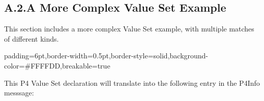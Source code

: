\documentclass[11pt]{article}
\begin{document}
{%
\subsection{A.2.\hspace*{0.5em}A More Complex Value Set Example}\label{sec-value-set-example}%

\noindent{}This section includes a more complex Value Set example, with multiple matches of
different kinds.%

\begin{mdbmargintb}{6pt}{6pt}%
\begin{mdblock}{padding=6pt,border-width=0.5pt,border-style=solid,background-color=\#FFFFDD,breakable=true}%
\begin{mdpre}%
\end{mdpre}%
\end{mdblock}%
\end{mdbmargintb}%

\noindent{}This P4 Value Set declaration will translate into the following entry in the
P4Info messsage:%

}
\end{document}
